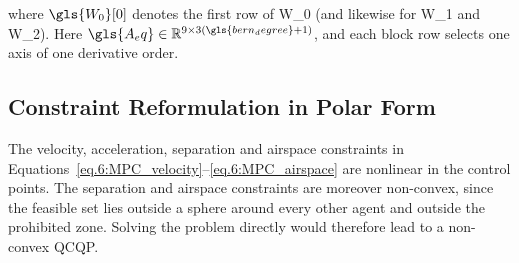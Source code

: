 where $\gls{W_0}[0]$ denotes the first row of \gls{W_0} (and likewise for \gls{W_1} and \gls{W_2}). Here $\gls{A_eq}\in\mathbb{R}^{9\times 3(\gls{bern_degree}+1)}$, and each block row selects one axis of one derivative order.

\subsection{Constraint Reformulation in Polar Form}

The velocity, acceleration, separation and airspace constraints in Equations~\eqref{eq.6:MPC_velocity}--\eqref{eq.6:MPC_airspace} are nonlinear in the control points. The separation and airspace constraints are moreover non-convex, since the feasible set lies outside a sphere around every other agent and outside the prohibited zone. Solving the problem directly would therefore lead to a non-convex \gls{QCQP}.

